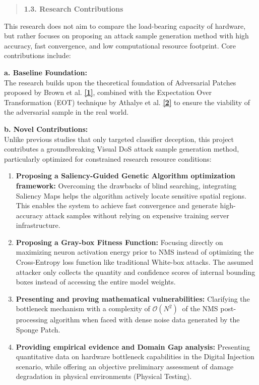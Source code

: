 \documentclass[]{article}
\begin{document}
\begin{quote}
\textbf{1.3. Research Contributions}
\end{quote}

This research does not aim to compare the load-bearing capacity of hardware, but rather focuses on proposing an attack sample generation method with high accuracy, fast convergence, and low computational resource footprint. Core contributions include:

\textbf{a. Baseline Foundation:}\\
The research builds upon the theoretical foundation of Adversarial Patches proposed by Brown et al. \hyperref[TL1]{\textbf{{[}1{]}}}, combined with the Expectation Over Transformation (EOT) technique by Athalye et al. \hyperref[TL2]{\textbf{{[}2{]}}} to ensure the viability of the adversarial sample in the real world.

\textbf{b. Novel Contributions:}\\
Unlike previous studies that only targeted classifier deception, this project contributes a groundbreaking Visual DoS attack sample generation method, particularly optimized for constrained research resource conditions:

\begin{enumerate}
\def\labelenumi{\arabic{enumi}.}
\item
  \textbf{Proposing a Saliency-Guided Genetic Algorithm optimization framework:} Overcoming the drawbacks of blind searching, integrating Saliency Maps helps the algorithm actively locate sensitive spatial regions. This enables the system to achieve fast convergence and generate high-accuracy attack samples without relying on expensive training server infrastructure.
\item
  \textbf{Proposing a Gray-box Fitness Function:} Focusing directly on maximizing neuron activation energy prior to NMS instead of optimizing the Cross-Entropy loss function like traditional White-box attacks. The assumed attacker only collects the quantity and confidence scores of internal bounding boxes instead of accessing the entire model weights.
\item
  \textbf{Presenting and proving mathematical vulnerabilities:} Clarifying the bottleneck mechanism with a complexity of \(\mathcal{O}\left( N^{2} \right)\ \) of the NMS post-processing algorithm when faced with dense noise data generated by the Sponge Patch.
\item
  \textbf{Providing empirical evidence and Domain Gap analysis:} Presenting quantitative data on hardware bottleneck capabilities in the Digital Injection scenario, while offering an objective preliminary assessment of damage degradation in physical environments (Physical Testing).
\end{enumerate}
\end{document}
